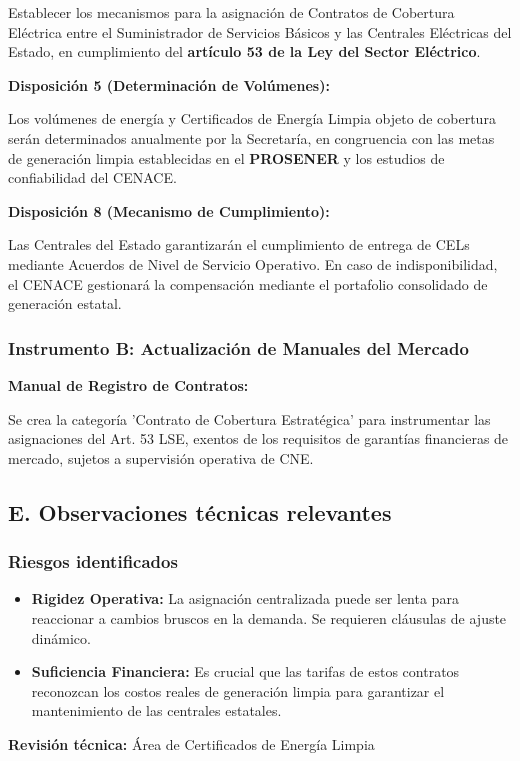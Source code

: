 \documentclass{cel}
\begin{document}
\textquotedbl{}Establecer los mecanismos para la asignación de Contratos de Cobertura Eléctrica entre el Suministrador de Servicios Básicos y las Centrales Eléctricas del Estado, en cumplimiento del \textbf{artículo 53 de la Ley del Sector Eléctrico}.\textquotedbl{}


\textbf{Disposición 5 (Determinación de Volúmenes):}

\textquotedbl{}Los volúmenes de energía y Certificados de Energía Limpia objeto de cobertura serán determinados anualmente por la Secretaría, en congruencia con las metas de generación limpia establecidas en el \textbf{PROSENER} y los estudios de confiabilidad del CENACE.\textquotedbl{}


\textbf{Disposición 8 (Mecanismo de Cumplimiento):}

\textquotedbl{}Las Centrales del Estado garantizarán el cumplimiento de entrega de CELs mediante Acuerdos de Nivel de Servicio Operativo. En caso de indisponibilidad, el CENACE gestionará la compensación mediante el portafolio consolidado de generación estatal.\textquotedbl{}


\subsubsection{Instrumento B: Actualización de Manuales del Mercado}
\nopagebreak

\textbf{Manual de Registro de Contratos:}

\textquotedbl{}Se crea la categoría 'Contrato de Cobertura Estratégica' para instrumentar las asignaciones del Art. 53 LSE, exentos de los requisitos de garantías financieras de mercado, sujetos a supervisión operativa de CNE.\textquotedbl{}


\subsection{E. Observaciones técnicas relevantes}
\nopagebreak

\subsubsection{Riesgos identificados}
\nopagebreak

\begin{itemize}
\item \textbf{Rigidez Operativa:} La asignación centralizada puede ser lenta para reaccionar a cambios bruscos en la demanda. Se requieren cláusulas de ajuste dinámico.
\item \textbf{Suficiencia Financiera:} Es crucial que las tarifas de estos contratos reconozcan los costos reales de generación limpia para garantizar el mantenimiento de las centrales estatales.


\end{itemize}
\textbf{Revisión técnica:} Área de Certificados de Energía Limpia
\end{document}
